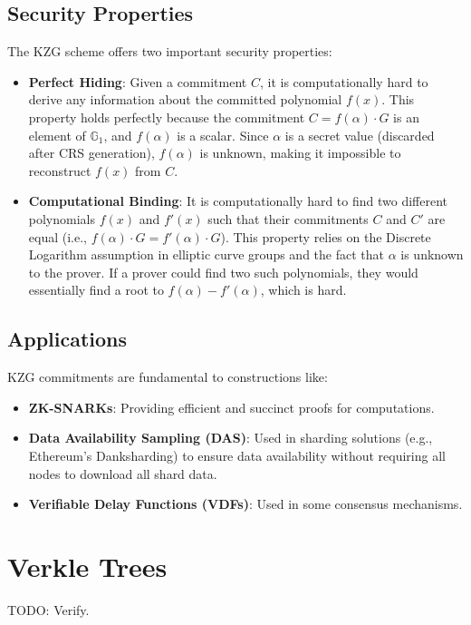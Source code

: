\subsection{Security Properties}
The KZG scheme offers two important security properties:
\begin{itemize}
    \item \textbf{Perfect Hiding}: Given a commitment $C$, it is computationally hard to derive any information about the committed polynomial $f(x)$. This property holds perfectly because the commitment $C=f(\alpha)\cdot G$ is an element of $\mathbb{G}_1$, and $f(\alpha)$ is a scalar. Since $\alpha$ is a secret value (discarded after CRS generation), $f(\alpha)$ is unknown, making it impossible to reconstruct $f(x)$ from $C$.
    \item \textbf{Computational Binding}: It is computationally hard to find two different polynomials $f(x)$ and $f'(x)$ such that their commitments $C$ and $C'$ are equal (i.e., $f(\alpha)\cdot G = f'(\alpha)\cdot G$). This property relies on the Discrete Logarithm assumption in elliptic curve groups and the fact that $\alpha$ is unknown to the prover. If a prover could find two such polynomials, they would essentially find a root to $f(\alpha) - f'(\alpha)$, which is hard.
\end{itemize}

\subsection{Applications}
KZG commitments are fundamental to constructions like:
\begin{itemize}
    \item \textbf{ZK-SNARKs}: Providing efficient and succinct proofs for computations.
    \item \textbf{Data Availability Sampling (DAS)}: Used in sharding solutions (e.g., Ethereum's Danksharding) to ensure data availability without requiring all nodes to download all shard data.
    \item \textbf{Verifiable Delay Functions (VDFs)}: Used in some consensus mechanisms.
\end{itemize}


\section{Verkle Trees}
TODO: Verify.

